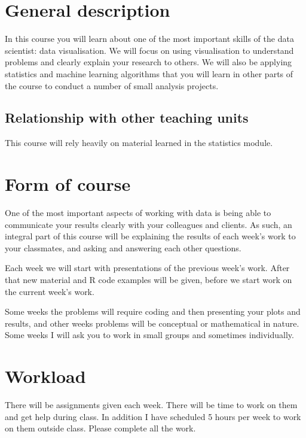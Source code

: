 \section{General description}

In this course you will learn about one of the most important skills of the data scientist: data visualisation.  We will focus on using visualisation to understand problems and clearly explain your research to others.  We will also be applying statistics and machine learning algorithms that you will learn in other parts of the course to conduct a number of small analysis projects.

\subsection{Relationship with other teaching units}

This course will rely heavily on material learned in the statistics module.

\section*{Form of course}

One of the most important aspects of working with data is being able to communicate your results clearly with your colleagues and clients.  As such, an integral part of this course will be explaining the results of each week's work to your classmates, and asking and answering each other questions.

Each week we will start with presentations of the previous week's work.  After that new material and R code examples will be given, before we start work on the current week's work.

Some weeks the problems will require coding and then presenting your plots and results, and other weeks problems will be conceptual or mathematical in nature. Some weeks I will ask you to work in small groups and sometimes individually.

\section*{Workload}

There will be assignments given each week.  There will be time to work on them and get help during class.  In addition I have scheduled 5 hours per week to work on them outside class.  Please complete all the work.
